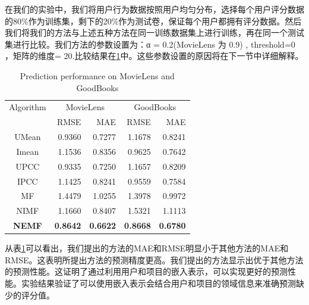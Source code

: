 \documentclass[lang=cn,11pt]{elegantpaper}
\begin{document}
在我们的实验中，我们将用户行为数据按照用户均匀分布，选择每个用户评分数据的80\%作为训练集，剩下的20\%作为测试卷，保证每个用户都拥有评分数据。然后我们将我们的方法与上述五种方法在同一训练数据集上进行训练，再在同一个测试集进行比较。我们方法的参数设置为：α = 0.2(MovieLens 为 0.9) , threshold=0 ，矩阵的维度= 20.比较结果在\ref{tab:result}中。这些参数设置的原因将在下一节中详细解释。

\begin{table}[tbp]
	\centering
	\caption{Prediction performance on MovieLens and GoodBooks \label{tab:result}}
	\setlength{\tabcolsep}{7mm}
	
	\begin{tabular}{ccrrrr}
		\toprule
		\multicolumn{ 2}{c}{Algorithm} & \multicolumn{ 2}{c}{MovieLens} & \multicolumn{ 2}{c}{GoodBooks} \\
		
		\multicolumn{ 2}{c}{} &       RMSE &        MAE &       RMSE &        MAE \\
		
		\midrule
		
		\multicolumn{ 2}{c}{UMean} &     0.9360 &      0.7277 &     1.1678 &     0.8241 \\	
		
		\multicolumn{ 2}{c}{Imean} &     1.1536 &      0.8356 &     0.9625 &     0.7642 \\
		
		\multicolumn{ 2}{c}{UPCC} &     0.9335 &      0.7250 &     1.1657 &     0.8209 \\
		
		\multicolumn{ 2}{c}{IPCC} &     1.1425 &     0.8241 &     0.9559 &     0.7584 \\
		
		\multicolumn{ 2}{c}{MF} &     1.4479 &     1.0255 &     1.3978 &     0.9972 \\
		
		\multicolumn{ 2}{c}{NIMF} &    1.1660 &    0.8407&    1.5321 &     1.1113 \\
		
		\multicolumn{ 2}{c}{\textbf{NEMF}} &     \textbf{0.8642} &     \textbf{0.6622} &     \textbf{0.8668} &     \textbf{0.6780} \\
		\bottomrule
	\end{tabular} 	
\end{table}

从表\ref{tab:result}可以看出，我们提出的方法的MAE和RMSE明显小于其他方法的MAE和RMSE。这表明所提出方法的预测精度更高。我们提出的方法显示出优于其他方法的预测性能。这证明了通过利用用户和项目的嵌入表示，可以实现更好的预测性能。实验结果验证了可以使用嵌入表示会结合用户和项目的领域信息来准确预测缺少的评分值。
\end{document}
